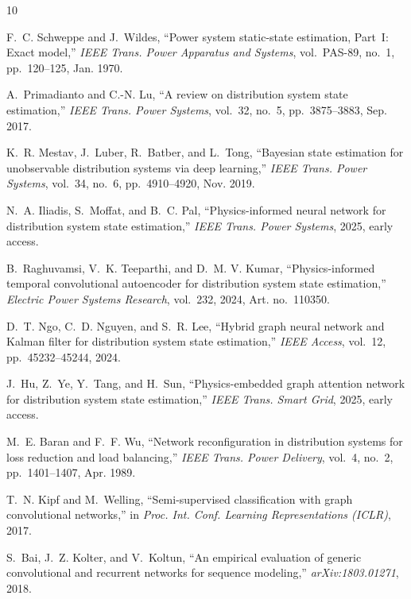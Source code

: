 \documentclass[conference]{IEEEtran}
\begin{document}
\begin{thebibliography}{10}

F.~C. Schweppe and J.~Wildes, ``Power system static-state estimation, Part~I: Exact model,'' \textit{IEEE Trans. Power Apparatus and Systems}, vol.~PAS-89, no.~1, pp.~120--125, Jan. 1970.

A.~Primadianto and C.-N. Lu, ``A review on distribution system state estimation,'' \textit{IEEE Trans. Power Systems}, vol.~32, no.~5, pp.~3875--3883, Sep. 2017.

K.~R. Mestav, J.~Luber, R.~Batber, and L.~Tong, ``Bayesian state estimation for unobservable distribution systems via deep learning,'' \textit{IEEE Trans. Power Systems}, vol.~34, no.~6, pp.~4910--4920, Nov. 2019.

N.~A. Iliadis, S.~Moffat, and B.~C. Pal, ``Physics-informed neural network for distribution system state estimation,'' \textit{IEEE Trans. Power Systems}, 2025, early access.

B.~Raghuvamsi, V.~K. Teeparthi, and D.~M. V. Kumar, ``Physics-informed temporal convolutional autoencoder for distribution system state estimation,'' \textit{Electric Power Systems Research}, vol.~232, 2024, Art. no.~110350.

D.~T. Ngo, C.~D. Nguyen, and S.~R. Lee, ``Hybrid graph neural network and Kalman filter for distribution system state estimation,'' \textit{IEEE Access}, vol.~12, pp.~45232--45244, 2024.

J.~Hu, Z.~Ye, Y.~Tang, and H.~Sun, ``Physics-embedded graph attention network for distribution system state estimation,'' \textit{IEEE Trans. Smart Grid}, 2025, early access.

M.~E. Baran and F.~F. Wu, ``Network reconfiguration in distribution systems for loss reduction and load balancing,'' \textit{IEEE Trans. Power Delivery}, vol.~4, no.~2, pp.~1401--1407, Apr. 1989.

T.~N. Kipf and M.~Welling, ``Semi-supervised classification with graph convolutional networks,'' in \textit{Proc. Int. Conf. Learning Representations (ICLR)}, 2017.

S.~Bai, J.~Z. Kolter, and V.~Koltun, ``An empirical evaluation of generic convolutional and recurrent networks for sequence modeling,'' \textit{arXiv:1803.01271}, 2018.

\end{thebibliography}
\end{document}

